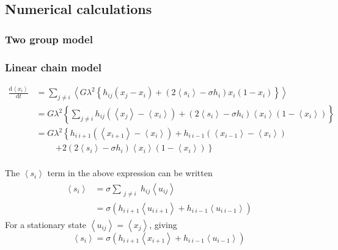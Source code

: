 \documentclass[12pt]{article}
\begin{document}
\subsection{Numerical calculations}
\subsubsection{Two group model}

\subsubsection{Linear chain model}

\begin{align}\label{dxidt}
\frac{\mathrm d \left\langle x_i \right\rangle}{\mathrm dt}  &= \sum\limits_{j \neq i}  \left\langle G \lambda^{2} \left\lbrace h_{ij} \left(x_j - x_i \right)  + \left( 2\left\langle s_i \right\rangle - \sigma h_i \right) x_i \left(1-x_i  \right) \right\rbrace \right\rangle \nonumber \\
%
%
&=  G \lambda^{2} \left\lbrace \sum\limits_{j \neq i} h_{ij} \left( \left\langle x_j \right\rangle -  \left\langle x_i \right\rangle \right)  + \left( 2\left\langle s_i \right\rangle - \sigma h_i \right) \left\langle x_i \right\rangle \left(1- \left\langle x_i \right\rangle \right) \right\rbrace \nonumber \\ 
%
%
%
%
&= G\lambda^{2} \left\lbrace  h_{i \ i+1} \left( \left\langle x_{i+1} \right\rangle -  \left\langle x_i \right\rangle \right) + h_{i \ i-1} \left( \left\langle x_{i-1} \right\rangle -  \left\langle x_i \right\rangle \right) \right. \nonumber \\ & \phantom{blaaa} \left. + 2 \left( 2\left\langle s_i \right\rangle - \sigma h_i \right) \left\langle x_i \right\rangle \left(1- \left\langle x_i \right\rangle \right) \right\rbrace \nonumber  \\ 
\end{align}

The $\left\langle s_i \right\rangle$ term in the above expression can be written
\begin{eqnarray}
\begin{split}
\left\langle s_i \right\rangle  &= \sigma \sum_{\substack{j \neq i}} h_{ij} \left\langle u_{ij} \right\rangle \\
%
&= \sigma \left( h_{i \ i+1} \left\langle u_{i \ i+1} \right\rangle + h_{i \ i-1} \left\langle u_{i \ i-1}\right\rangle \right)
\end{split}
\end{eqnarray}
For a stationary state $\left\langle u_{ij} \right\rangle = \left\langle x_{j} \right\rangle$, giving
\begin{equation}\label{si}
\left\langle s_i \right\rangle = \sigma \left( h_{i \ i+1} \left\langle x_{i+1} \right\rangle + h_{i \ i-1} \left\langle u_{i-1}\right\rangle \right)
\end{equation}
\end{document}
